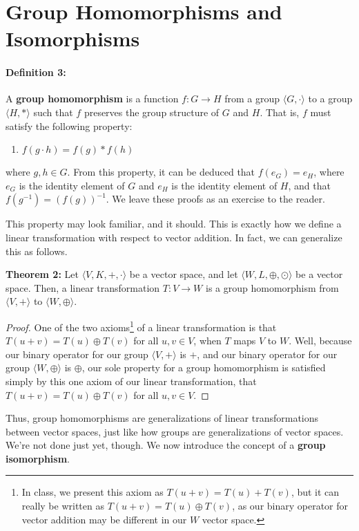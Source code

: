 \documentclass{article}
\newcommand{\done}{\renewcommand\qedsymbol{$\blacksquare$}}
\begin{document}
\section{Group Homomorphisms and Isomorphisms} 

\paragraph{Definition 3:} A \textbf{group homomorphism} is a function $f:G\rightarrow H$ from a group 
$\langle G, \cdot\rangle$ to a group $\langle H, *\rangle$ such that 
$f$ preserves the group structure of $G$ and $H$. That is, $f$ must satisfy the following
property:
\begin{enumerate}
    \item $f(g\cdot h) = f(g) * f(h)$
\end{enumerate}
where $g,h\in G$.
From this property, it can be deduced that $f(e_G) = e_H$, where $e_G$ is the
identity element of $G$ and $e_H$ is the identity element of $H$, and that 
$f(g^{-1}) = (f(g))^{-1}$. We leave these proofs as an exercise to the reader.

This property may look familiar, and it should. This is exactly how we define a linear 
transformation with respect to vector addition. In fact, we can generalize this 
as follows. 

\begin{mdframed}[roundcorner=10pt, backgroundcolor=gray!10]
  \textbf{Theorem 2:} Let $\langle V, K, +, \cdot \rangle$ be a vector space, and let
  $\langle W, L, \oplus, \odot \rangle$ be a vector space. Then, a linear transformation
  $T:V\rightarrow W$ is a group homomorphism from $\langle V, + \rangle$ to $\langle W, \oplus \rangle$.
\end{mdframed}
\begin{proof}
One of the two axioms\footnote[3]{In class, we present this axiom as $T(u+v) = T(u) + T(v)$, but it can really be written as $T(u+v) = T(u) \oplus T(v)$, as our binary operator for vector addition may be different in our $W$ vector space.} of 
a linear transformation is that $T(u+v) = T(u) \oplus T(v)$ for all $u,v \in V$, when $T$
maps $V$ to $W$. Well, because our binary operator for our group $\langle V, + \rangle$ is $+$, and our binary operator for our group $\langle W, \oplus \rangle$ is $\oplus$, 
our sole property for a group homomorphism is satisfied simply by this one axiom 
of our linear transformation, that $T(u+v) = T(u) \oplus T(v)$ for all $u,v \in V$.
\done 
\end{proof}
Thus, group homomorphisms are generalizations of linear transformations between 
vector spaces, just like 
how groups are generalizations of vector spaces. We're not done just yet, though.
We now introduce the concept of a \textbf{group isomorphism}.
\end{document}
